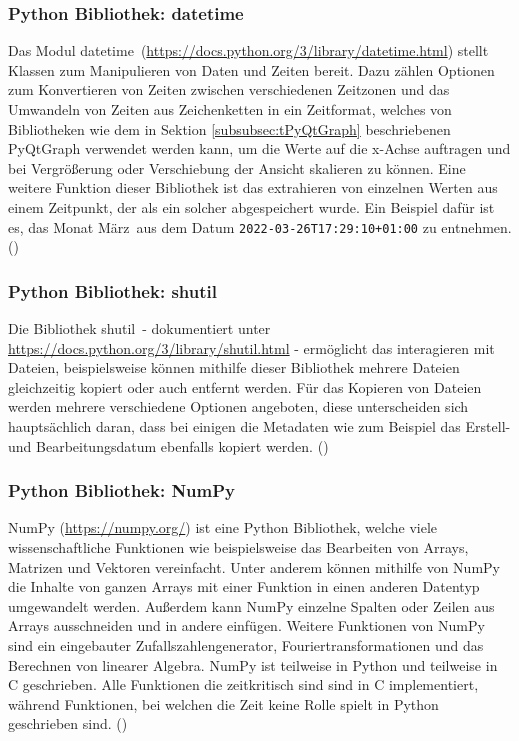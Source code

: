 \subsubsection{Python Bibliothek: datetime}
\label{subsubsec:tLibDatetime}
Das Modul \glqq datetime\grqq\ (\url{https://docs.python.org/3/library/datetime.html}) stellt Klassen zum Manipulieren von Daten und Zeiten bereit. Dazu zählen Optionen zum Konvertieren von Zeiten zwischen verschiedenen Zeitzonen und das Umwandeln von Zeiten aus Zeichenketten in ein Zeitformat, welches von Bibliotheken wie dem in Sektion \ref{subsubsec:tPyQtGraph} beschriebenen PyQtGraph verwendet werden kann, um die Werte auf die x-Achse auftragen und bei Vergrößerung oder Verschiebung der Ansicht skalieren zu können. Eine weitere Funktion dieser Bibliothek ist das extrahieren von einzelnen Werten aus einem Zeitpunkt, der als ein solcher abgespeichert wurde. Ein Beispiel dafür ist es, das Monat \glqq März\grqq\ aus dem Datum \verb|2022-03-26T17:29:10+01:00| zu entnehmen.
(\cite{PythonDocs})

\subsubsection{Python Bibliothek: shutil}
\label{subsubsec:tShutil}
Die Bibliothek \glqq shutil\grqq\ - dokumentiert unter \url{https://docs.python.org/3/library/shutil.html} - ermöglicht das interagieren mit Dateien, beispielsweise können mithilfe dieser Bibliothek mehrere Dateien gleichzeitig kopiert oder auch entfernt werden. Für das Kopieren von Dateien werden mehrere verschiedene Optionen angeboten, diese unterscheiden sich hauptsächlich daran, dass bei einigen die Metadaten wie zum Beispiel das Erstell- und Bearbeitungsdatum ebenfalls kopiert werden.
(\cite{PythonDocs})

\subsubsection{Python Bibliothek: NumPy}
\label{subsubsec:tNumpy}
NumPy (\url{https://numpy.org/}) ist eine Python Bibliothek, welche viele wissenschaftliche Funktionen wie beispielsweise das Bearbeiten von Arrays, Matrizen und Vektoren vereinfacht. Unter anderem können mithilfe von NumPy die Inhalte von ganzen Arrays mit einer Funktion in einen anderen Datentyp umgewandelt werden. Außerdem kann NumPy einzelne Spalten oder Zeilen aus Arrays ausschneiden und in andere einfügen. Weitere Funktionen von NumPy sind ein eingebauter Zufallszahlengenerator, Fouriertransformationen und das Berechnen von linearer Algebra. NumPy ist teilweise in Python und teilweise in C geschrieben. Alle Funktionen die zeitkritisch sind sind in C implementiert, während Funktionen, bei welchen die Zeit keine Rolle spielt in Python geschrieben sind.
(\cite{NumPyDocs})

